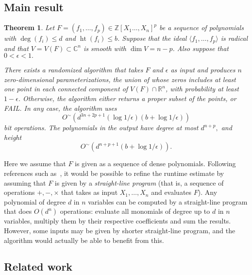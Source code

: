 \documentclass[a4paper]{article}
\DeclareMathOperator{\htt}{ht}
\newcommand{\ZZ}{{\mathbb{Z}}}
\def\C{\mathbb{C}}
\def\R{\mathbb{R}}
\newtheorem{theorem}{Theorem}[section]
\begin{document}
\subsection{Main result} 

%
%
\begin{theorem}\label{theo:main}
  Let $F= (f_1,\hdots,f_p)\in\ZZ[X_1\hdots,X_n]^p$ be a sequence of polynomials with $\deg(f_i) \leq d$ and $\htt(f_i) \leq b$. Suppose that the ideal $\langle f_1,\hdots, f_p \rangle $ is radical and that $V=V(F) \subset \C^n$ is 
  smooth with $\dim V = n-p$. Also suppose that $0 < \epsilon < 1.$

  There exists a randomized algorithm that takes $F$ and $\epsilon$ as input and produces $n$ zero-dimensional parameterizations, the union
  of whose zeros includes at least one point in each connected
  component of $V(F) \cap \R^n$, with probability at least
  $1-\epsilon$. Otherwise, the algorithm either returns a proper
  subset of the points, or FAIL.  In any case, the algorithm uses
  \[
O^{\sim}(d^{3n+2p+1}(\log1/\epsilon)(b + \log1/\epsilon))
  \]
  bit operations. The polynomials in
  the output have degree at most $d^{n+p},$ and height 
  \[
O^{\sim}(d^{n+p+1}(b + \log1/\epsilon)).
  \]
\end{theorem}
%
%
\noindent 
Here we assume that $F$ is given as a sequence of dense polynomials.  Following
references such
as~\cite{GiHeMoPa95,GiHaHeMoMoPa97,GiHeMoMoPa98,BaGiHeMb97,EMP}, it
would be possible to refine the runtime estimate by assuming that $F$
is given by a {\em straight-line program} (that is, a sequence of
operations $+,-,\times$ that takes as input $X_1,\dots,X_n$ and
evaluates $F$). Any polynomial of degree $d$ in $n$ variables can be computed by a straight-line program that does $O(d^n)$ operations: evaluate all monomials of degree up to $d$ in $n$ variables, multiply them by their respective coefficients and sum the results. However, some inputs may be given by shorter straight-line program, and the algorithm would actually be able to benefit from this. 






\subsection{Related work}
\end{document}
